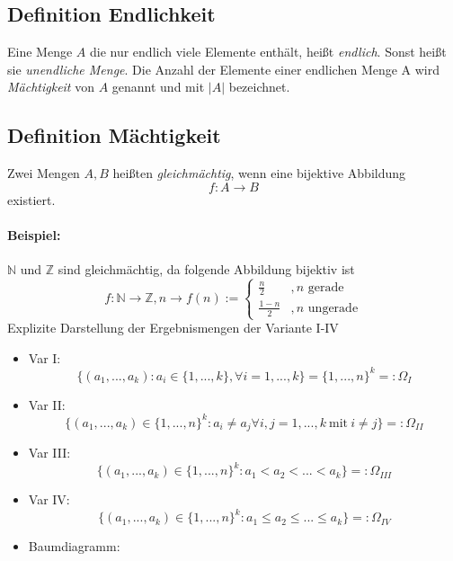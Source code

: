 \documentclass[12pt,a4paper]{article}
\newcommand{\newpara}{\vskip 0.5cm}
\begin{document}
	\subsection{Definition Endlichkeit}
	Eine Menge $A$ die nur endlich viele Elemente enthält, heißt \textit{endlich}. Sonst heißt sie
	\textit{unendliche Menge}. Die Anzahl der Elemente einer endlichen Menge A wird \textit{Mächtigkeit} von
	$A$ genannt und mit $|A|$ bezeichnet.
\newpara
	\subsection{Definition Mächtigkeit}
	Zwei Mengen $A,B$ heißten \textit{gleichmächtig}, wenn eine bijektive Abbildung
	$$f:A\rightarrow B$$
	existiert.
	\paragraph{Beispiel: } 
	$\mathbb{N}$ und $\mathbb{Z}$ sind gleichmächtig, da folgende Abbildung bijektiv ist	
	\[
 	f:\mathbb{N}\rightarrow\mathbb{Z},n\rightarrow f(n):=\left\{\begin{array}{lr}
 		\frac{n}{2} &,n \text{ gerade}\\
 		\frac{1-n}{2} &,n \text{ ungerade} 	
 	\end{array}\right.
 	\]
	Explizite Darstellung der Ergebnismengen der Variante I-IV
	\begin{itemize}
		\item Var I: 
		$$\{(a_1,...,a_k):a_i\in\{1,...,k\},\forall i=1,...,k\} = \{1,...,n\}^k=:\Omega_I$$
		\item Var II:
		$$\{(a_1,...,a_k)\in\{1,...,n\}^k:a_i\neq a_j \forall i,j=1,...,k\: \text{mit} \: i\neq j\} =:\Omega_{II}$$
		\item Var III:
		$$\{(a_1,...,a_k)\in\{1,...,n\}^k:a_1<a_2<...<a_k\}=:\Omega_{III}$$
		\item Var IV:
		$$\{(a_1,...,a_k)\in\{1,...,n\}^k:a_1\leq a_2\leq ...\leq a_k\}=:\Omega_{IV}$$
		\item Baumdiagramm:
	\end{itemize}		 	
\end{document}
